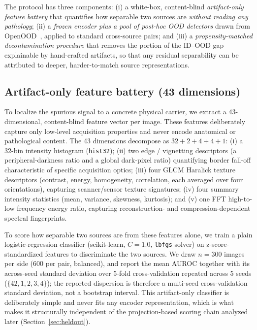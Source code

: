 \documentclass{article}
\begin{document}
The protocol has three components: (i) a white-box, content-blind
\emph{artifact-only feature battery} that quantifies how separable two sources
are \emph{without reading any pathology}; (ii) a \emph{frozen encoder plus a
pool of post-hoc OOD detectors} drawn from OpenOOD~\citep{yang2022openood},
applied to standard cross-source pairs; and (iii) a \emph{propensity-matched
decontamination procedure} that removes the portion of the ID--OOD gap
explainable by hand-crafted artifacts, so that any residual separability can be
attributed to deeper, harder-to-match source representations.

\subsection{Artifact-only feature battery (43 dimensions)}

To localize the spurious signal to a concrete physical carrier, we extract a
43-dimensional, content-blind feature vector per image. These features
deliberately capture only low-level acquisition properties and never encode
anatomical or pathological content. The 43 dimensions decompose as
$32 + 2 + 4 + 4 + 1$: (i) a 32-bin intensity histogram (\texttt{hist32}); (ii)
two edge / vignetting descriptors (a peripheral-darkness ratio and a global
dark-pixel ratio) quantifying border fall-off characteristic of specific
acquisition optics; (iii) four GLCM Haralick texture descriptors (contrast,
energy, homogeneity, correlation, each averaged over four orientations),
capturing scanner/sensor texture signatures; (iv) four summary intensity
statistics (mean, variance, skewness, kurtosis); and (v) one FFT high-to-low
frequency energy ratio, capturing reconstruction- and compression-dependent
spectral fingerprints.

To score how separable two sources are from these features alone, we train a
plain logistic-regression classifier (scikit-learn, $C = 1.0$, \texttt{lbfgs}
solver) on z-score-standardized features to discriminate the two sources. We
draw $n = 300$ images per side ($600$ per pair, balanced), and report the mean
AUROC together with its across-seed standard deviation over $5$-fold
cross-validation repeated across $5$ seeds ($\{42, 1, 2, 3, 4\}$); the reported
dispersion is therefore a multi-seed cross-validation standard deviation, not a
bootstrap interval. This artifact-only classifier is deliberately simple and
never fits any encoder representation, which is what makes it structurally
independent of the projection-based scoring chain analyzed later
(Section~\ref{sec:heldout}).
\end{document}

